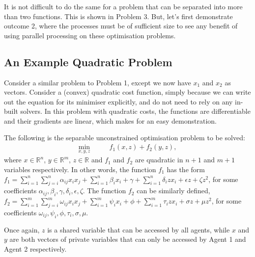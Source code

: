 \documentclass[12pt]{article}
\begin{document}
It is not difficult to do the same for a problem that can be separated into more than two functions. This is shown in Problem 3. But, let's first demonstrate outcome 2, where the processes must be of sufficient size to see any benefit of using parallel processing on these optimisation problems.

\subsection*{An Example Quadratic Problem}

Consider a similar problem to Problem 1, except we now have $x_1$ and $x_2$ as vectors. Consider a (convex) quadratic cost function, simply because we can write out the equation for its minimiser explicitly, and do not need to rely on any in-built solvers. In this problem with quadratic costs, the functions are differentiable and their gradients are linear, which makes for an easy demonstration.

The following is the separable unconstrained optimisation problem to be solved:
\begin{align*}
\min_{x,y,z}\qquad& f_1(x,z)+f_2(y,z),
\end{align*}
where $x\in\mathbb{R}^n$, $y\in\mathbb{R}^m$, $z\in\mathbb{R}$ and $f_1$ and $f_2$ are quadratic in $n+1$ and $m+1$ variables respectively. In other words, the function $f_1$ has the form $f_1=\sum\limits_{i=1}^n \sum\limits_{j=i}^n \alpha_{ij}x_ix_j + \sum\limits_{i=1}^n \beta_ix_i+\gamma+\sum\limits_{i=1}^n \delta_izx_i+\epsilon z+\zeta z^2$, for some coefficients $\alpha_{ij},\beta_i,\gamma,\delta_i,\epsilon,\zeta$. The function $f_2$ can be similarly defined, $f_2=\sum\limits_{i=1}^m \sum\limits_{j=i}^m \omega_{ij}x_ix_j + \sum\limits_{i=1}^m \psi_ix_i+\phi+\sum\limits_{i=1}^m \tau_izx_i+\sigma z+\mu z^2$, for some coefficients $\omega_{ij},\psi_i,\phi,\tau_i,\sigma,\mu$.

Once again, $z$ is a shared variable that can be accessed by all agents, while $x$ and $y$ are both vectors of private variables that can only be accessed by Agent 1 and Agent 2 respectively.
\end{document}
